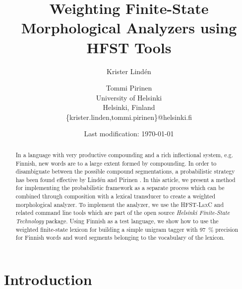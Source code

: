 \documentclass[postprint]{flammie}
\begin{document}

\ifpdf
{}
\fi

\title{Weighting Finite-State Morphological Analyzers
  using \textsc{HFST} Tools
  }

\author{Krister Lindén \and Tommi Pirinen \\
  University of Helsinki\\
  Helsinki, Finland\\
  \{krister.linden,tommi.pirinen\}@helsinki.fi\\
}

\date{Last modification: \today}

\maketitle
\begin{abstract}
  In a language with very productive compounding and a rich
  inflectional system, e.g. Finnish, new words are to a large extent
  formed by compounding. In order to disambiguate between the possible
  compound segmentations, a probabilistic strategy has been found
  effective by Lindén and Pirinen \cite{linden09nodalida}. In this
  article, we present a method for implementing the probabilistic
  framework as a separate process which can be combined through
  composition with a lexical transducer to create a weighted
  morphological analyzer. To implement the analyzer, we use the
  \textsc{HFST-LexC} and related command line tools which are part of
  the open source \emph{Helsinki Finite-State Technology} package.
  Using Finnish as a test language, we show how to use the weighted
  finite-state lexicon for building a simple unigram tagger with 97~\%
  precision for Finnish words and word segments belonging to the
  vocabulary of the lexicon.
\end{abstract}


\section{Introduction}
\end{document}
